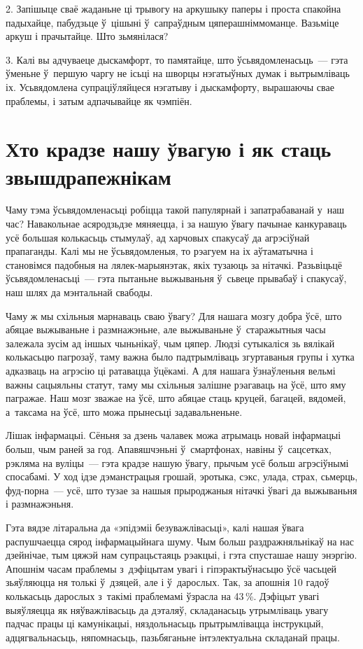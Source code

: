 2. Запішыце сваё жаданьне ці трывогу на аркушыку паперы і проста спакойна падыхайце, пабудзьце ў~цішыні ў~сапраўдным цяперашніммоманце. Вазьміце аркуш і прачытайце. Што зьмянілася?

3. Калі вы адчуваеце дыскамфорт, то памятайце, што ўсьвядомленасьць~--- гэта ўменьне ў~першую чаргу не ісьці на шворцы нэгатыўных думак і вытрымліваць іх. Усьвядомлена супраціўляйцеся нэгатыву і дыскамфорту, вырашаючы свае праблемы, і затым адпачывайце як чэмпіён.


\section{Хто крадзе нашу ўвагую і як стаць звышдрапежнікам}

Чаму тэма ўсьвядомленасьці робіцца такой папулярнай і запатрабаванай у~наш час? Навакольнае асяродзьдзе мяняецца, і за нашую ўвагу пачынае канкураваць усё большая колькасьць стымулаў, ад харчовых спакусаў да агрэсіўнай прапаганды. Калі мы не ўсьвядомленыя, то рэагуем на іх аўтаматычна і становімся падобныя на лялек-марыянэтак, якіх тузаюць за нітачкі. Разьвіцьцё ўсьвядомленасьці~--- гэта пытаньне выжываньня ў~сьвеце прывабаў і спакусаў, наш шлях да мэнтальнай свабоды.

Чаму ж мы схільныя марнаваць сваю ўвагу? Для нашага мозгу добра ўсё, што абяцае выжываньне і размнажэньне, але выжываньне ў~старажытныя часы залежала зусім ад іншых чыньнікаў, чым цяпер. Людзі сутыкаліся зь вялікай колькасьцю пагрозаў, таму важна было падтрымліваць згуртаваныя групы і хутка адказваць на агрэсію ці ратавацца ўцёкамі. А для нашага ўзнаўленьня вельмі важны сацыяльны статут, таму мы схільныя залішне рэагаваць на ўсё, што яму пагражае. Наш мозг зважае на ўсё, што абяцае стаць круцей, багацей, вядомей, а~таксама на ўсё, што можа прынесьці задавальненьне.

Лішак інфармацыі. Сёньня за дзень чалавек можа атрымаць новай інфармацыі больш, чым раней за год. Апавяшчэньні ў~смартфонах, навіны ў~сацсетках, рэкляма на вуліцы~--- гэта крадзе нашую ўвагу, прычым усё больш агрэсіўнымі спосабамі. У ход ідзе дэманстрацыя грошай, эротыка, сэкс, улада, страх, сьмерць, фуд-порна~--- усё, што тузае за нашыя прыроджаныя нітачкі ўвагі да выжываньня і размнажэньня.

Гэта вядзе літаральна да «эпідэміі безуважлівасьці», калі нашая ўвага распушчаецца сярод інфармацыйнага шуму. Чым больш раздражняльнікаў на нас дзейнічае, тым цяжэй нам супрацьстаяць рэакцыі, і гэта спусташае нашу энэргію. Апошнім часам праблемы з~дэфіцытам увагі і гіпэрактыўнасьцю ўсё часьцей зьяўляюцца ня толькі ў~дзяцей, але і ў~дарослых. Так, за апошнія 10 гадоў колькасьць дарослых з~такімі праблемамі ўзрасла на 43\,\%. Дэфіцыт увагі выяўляецца як няўважлівасьць да дэталяў, складанасьць утрымліваць увагу падчас працы ці камунікацыі, няздольнасьць прытрымлівацца інструкцый, адцягвальнасьць, няпомнасьць, пазьбяганьне інтэлектуальна складанай працы.

